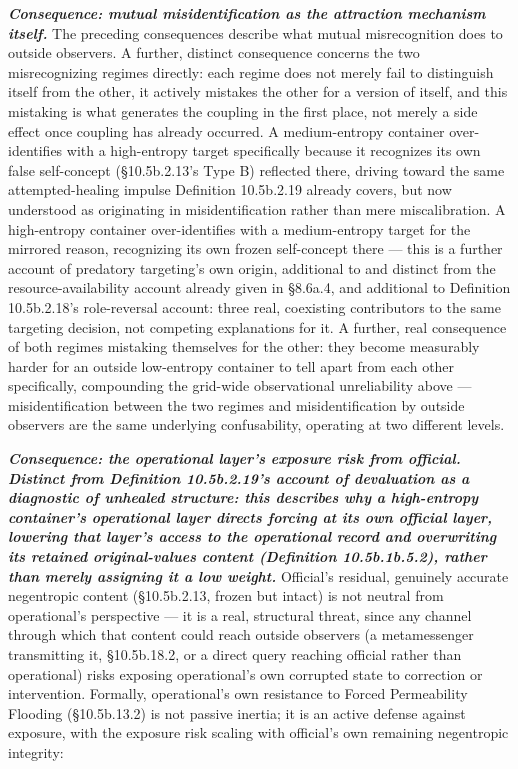 \documentclass[
]{article}
\begin{document}
\emph{\textbf{Consequence: mutual misidentification as the attraction
mechanism itself.}} The preceding consequences describe what mutual
misrecognition does to outside observers. A further, distinct
consequence concerns the two misrecognizing regimes directly: each
regime does not merely fail to distinguish itself from the other, it
actively mistakes the other for a version of itself, and this mistaking
is what generates the coupling in the first place, not merely a side
effect once coupling has already occurred. A medium-entropy container
over-identifies with a high-entropy target specifically because it
recognizes its own false self-concept (§10.5b.2.13's Type B) reflected
there, driving toward the same attempted-healing impulse Definition
10.5b.2.19 already covers, but now understood as originating in
misidentification rather than mere miscalibration. A high-entropy
container over-identifies with a medium-entropy target for the mirrored
reason, recognizing its own frozen self-concept there --- this is a
further account of predatory targeting's own origin, additional to and
distinct from the resource-availability account already given in
§8.6a.4, and additional to Definition 10.5b.2.18's role-reversal
account: three real, coexisting contributors to the same targeting
decision, not competing explanations for it. A further, real consequence
of both regimes mistaking themselves for the other: they become
measurably harder for an outside low-entropy container to tell apart
from each other specifically, compounding the grid-wide observational
unreliability above --- misidentification between the two regimes and
misidentification by outside observers are the same underlying
confusability, operating at two different levels.

\emph{\textbf{Consequence: the operational layer's exposure risk from
official. Distinct from Definition 10.5b.2.19's account of devaluation
as a diagnostic of unhealed structure: this describes why a high-entropy
container's operational layer directs forcing at its own official layer,
lowering that layer's access to the operational record and overwriting
its retained original-values content (Definition 10.5b.1b.5.2), rather
than merely assigning it a low weight.}} Official's residual, genuinely
accurate negentropic content (§10.5b.2.13, frozen but intact) is not
neutral from operational's perspective --- it is a real, structural
threat, since any channel through which that content could reach outside
observers (a metamessenger transmitting it, §10.5b.18.2, or a direct
query reaching official rather than operational) risks exposing
operational's own corrupted state to correction or intervention.
Formally, operational's own resistance to Forced Permeability Flooding
(§10.5b.13.2) is not passive inertia; it is an active defense against
exposure, with the exposure risk scaling with official's own remaining
negentropic integrity:
\end{document}
